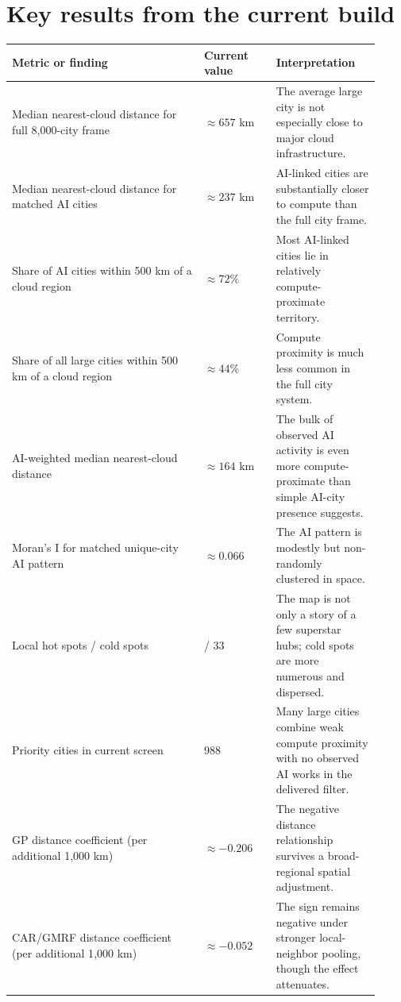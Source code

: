 \documentclass[11pt]{article}
\begin{document}
\section{Key results from the current build}
\begin{longtable}{>{\raggedright\arraybackslash}p{0.48\linewidth} >{\raggedright\arraybackslash}p{0.18\linewidth} >{\raggedright\arraybackslash}p{0.26\linewidth}}
\toprule
\textbf{Metric or finding} & \textbf{Current value} & \textbf{Interpretation} \\
\midrule
Median nearest-cloud distance for full 8{,}000-city frame & $\approx 657$ km & The average large city is not especially close to major cloud infrastructure. \\
Median nearest-cloud distance for matched AI cities & $\approx 237$ km & AI-linked cities are substantially closer to compute than the full city frame. \\
Share of AI cities within 500 km of a cloud region & $\approx 72\%$ & Most AI-linked cities lie in relatively compute-proximate territory. \\
Share of all large cities within 500 km of a cloud region & $\approx 44\%$ & Compute proximity is much less common in the full city system. \\
AI-weighted median nearest-cloud distance & $\approx 164$ km & The bulk of observed AI activity is even more compute-proximate than simple AI-city presence suggests. \\
Moran's I for matched unique-city AI pattern & $\approx 0.066$ & The AI pattern is modestly but non-randomly clustered in space. \\
Local hot spots / cold spots & 7 / 33 & The map is not only a story of a few superstar hubs; cold spots are more numerous and dispersed. \\
Priority cities in current screen & 1{,}988 & Many large cities combine weak compute proximity with no observed AI works in the delivered filter. \\
GP distance coefficient (per additional 1{,}000 km) & $\approx -0.206$ & The negative distance relationship survives a broad-regional spatial adjustment. \\
CAR/GMRF distance coefficient (per additional 1{,}000 km) & $\approx -0.052$ & The sign remains negative under stronger local-neighbor pooling, though the effect attenuates. \\
\bottomrule
\end{longtable}
\end{document}
